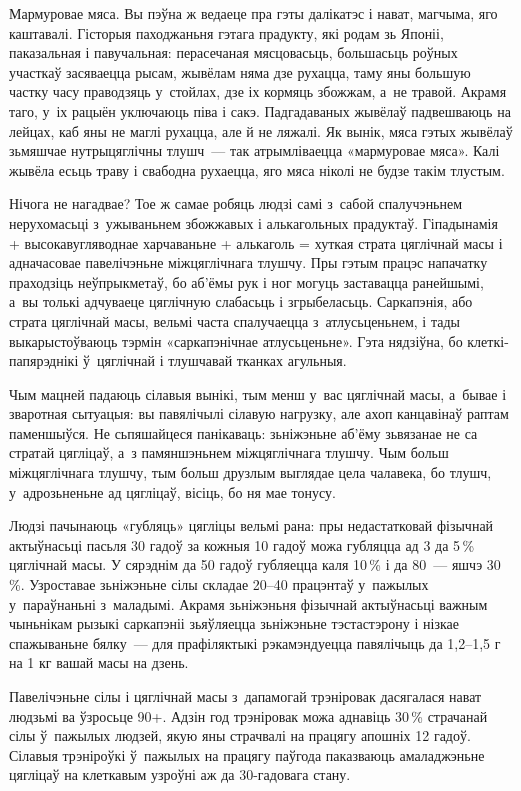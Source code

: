 Мармуровае мяса. Вы пэўна ж ведаеце пра гэты далікатэс і нават, магчыма, яго каштавалі. Гісторыя паходжаньня гэтага прадукту, які родам зь Японіі, паказальная і павучальная: перасечаная мясцовасьць, большасьць роўных участкаў засяваецца рысам, жывёлам няма дзе рухацца, таму яны большую частку часу праводзяць у~стойлах, дзе іх кормяць збожжам, а~не травой. Акрамя таго, у~іх рацыён уключаюць піва і сакэ. Падгадаваных жывёлаў падвешваюць на лейцах, каб яны не маглі рухацца, але й не ляжалі. Як вынік, мяса гэтых жывёлаў зьмяшчае нутрыцяглічны тлушч~--- так атрымліваецца «мармуровае мяса». Калі жывёла есьць траву і свабодна рухаецца, яго мяса ніколі не будзе такім тлустым.

Нічога не нагадвае? Тое ж самае робяць людзі самі з~сабой спалучэньнем нерухомасьці з~ужываньнем збожжавых і алькагольных прадуктаў. Гіпадынамія + высокавугляводнае харчаваньне + алькаголь = хуткая страта цяглічнай масы і адначасовае павелічэньне міжцяглічнага тлушчу. Пры гэтым працэс напачатку праходзіць неўпрыкметаў, бо аб'ёмы рук і ног могуць заставацца ранейшымі, а~вы толькі адчуваеце цяглічную слабасьць і згрыбеласьць. Саркапэнія, або страта цяглічнай масы, вельмі часта спалучаецца з~атлусьценьнем, і тады выкарыстоўваюць тэрмін «саркапэнічнае атлусьценьне». Гэта нядзіўна, бо клеткі-папярэднікі ў~цяглічнай і тлушчавай тканках агульныя.

Чым мацней падаюць сілавыя вынікі, тым менш у~вас цяглічнай масы, а~бывае і зваротная сытуацыя: вы павялічылі сілавую нагрузку, але ахоп канцавінаў раптам паменшыўся. Не сьпяшайцеся панікаваць: зьніжэньне аб'ёму зьвязанае не са стратай цягліцаў, а~з памяншэньнем міжцяглічнага тлушчу. Чым больш міжцяглічнага тлушчу, тым больш друзлым выглядае цела чалавека, бо тлушч, у~адрозьненьне ад цягліцаў, вісіць, бо ня мае тонусу.

Людзі пачынаюць «губляць» цягліцы вельмі рана: пры недастатковай фізычнай актыўнасьці пасьля 30 гадоў за кожныя 10 гадоў можа губляцца ад 3 да 5\,\% цяглічнай масы. У сярэднім да 50 гадоў губляецца каля 10\,\% і да 80~--- яшчэ 30\,\%. Узроставае зьніжэньне сілы складае 20--40 працэнтаў у~пажылых у~параўнаньні з~маладымі. Акрамя зьніжэньня фізычнай актыўнасьці важным чыньнікам рызыкі саркапэніі зьяўляецца зьніжэньне тэстастэрону і нізкае спажываньне бялку~--- для прафіляктыкі рэкамэндуецца павялічыць да 1,2--1,5 г на 1 кг вашай масы на дзень.

Павелічэньне сілы і цяглічнай масы з~дапамогай трэніровак дасягалася нават людзьмі ва ўзросьце 90+. Адзін год трэніровак можа аднавіць 30\,\% страчанай сілы ў~пажылых людзей, якую яны страчвалі на працягу апошніх 12 гадоў. Сілавыя трэніроўкі ў~пажылых на працягу паўгода паказваюць амаладжэньне цягліцаў на клеткавым узроўні аж да 30-гадовага стану.

